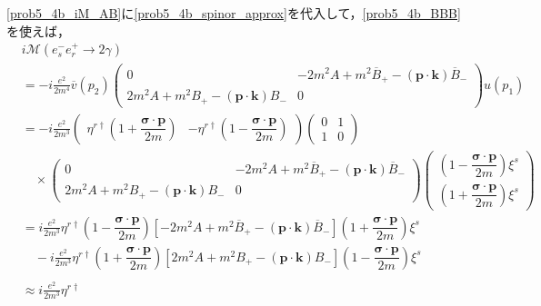 \eqref{prob5_4b_iM_AB}に\eqref{prob5_4b_spinor_approx}を代入して，\eqref{prob5_4b_BBB}を使えば，
\begin{align*}
  & i\mathcal{M}(e^-_se^+_r \to 2\gamma) \\
  &= -i\frac{e^2}{2m^4} \overline{v}(p_2)
  \begin{pmatrix}
    0 & -2m^2A + m^2\overline{B}_+ - (\boldsymbol{p}\cdot\boldsymbol{k}) \overline{B}_- \\
    2m^2A + m^2B_+ - (\boldsymbol{p}\cdot\boldsymbol{k}) B_- & 0
  \end{pmatrix}
  u(p_1) \\
  &= -i\frac{e^2}{2m^3}
  \begin{pmatrix}
    \eta^{r\dagger}
    \left( 1 + \dfrac{\boldsymbol\sigma \cdot \boldsymbol{p}}{2m} \right) & - \eta^{r\dagger} \left( 1 - \dfrac{\boldsymbol\sigma \cdot \boldsymbol{p}}{2m} \right)
  \end{pmatrix}
  \begin{pmatrix}
    0 & 1 \\
    1 & 0
  \end{pmatrix}
  \\
  & \quad \times
  \begin{pmatrix}
    0 & -2m^2A + m^2\overline{B}_+ - (\boldsymbol{p}\cdot\boldsymbol{k}) \overline{B}_- \\
    2m^2A + m^2B_+ - (\boldsymbol{p}\cdot\boldsymbol{k}) B_- & 0
  \end{pmatrix}
  \begin{pmatrix}
    \left( 1 - \dfrac{\boldsymbol\sigma \cdot \boldsymbol{p}}{2m} \right) \xi^s \\[10pt]
    \left( 1 + \dfrac{\boldsymbol\sigma \cdot \boldsymbol{p}}{2m} \right) \xi^s
  \end{pmatrix}
  \\
  & = i\frac{e^2}{2m^3} \eta^{r\dagger} \left( 1 - \dfrac{\boldsymbol\sigma \cdot \boldsymbol{p}}{2m} \right)
  \left[ -2m^2A + m^2\overline{B}_+ - (\boldsymbol{p}\cdot\boldsymbol{k}) \overline{B}_- \right]
  \left( 1 + \dfrac{\boldsymbol\sigma \cdot \boldsymbol{p}}{2m} \right) \xi^s \\
  &\quad -i\frac{e^2}{2m^3} \eta^{r\dagger} \left( 1 + \dfrac{\boldsymbol\sigma \cdot \boldsymbol{p}}{2m} \right)
  \left[ 2m^2A + m^2B_+ - (\boldsymbol{p}\cdot\boldsymbol{k}) B_- \right]
  \left( 1 - \dfrac{\boldsymbol\sigma \cdot \boldsymbol{p}}{2m} \right) \xi^s \\
  \\
  & \approx i\frac{e^2}{2m^3} \eta^{r\dagger}

\end{align*}
